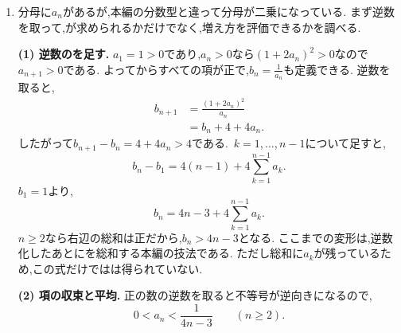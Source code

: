 \begin{enumerate}[label=\textbf{問\arabic*.},leftmargin=3.8em,format=\bookitemlink{practice-entrance}{solution}{problem}]
                第二項では$\sin^2\theta=1-\cos^2\theta$を使うと,
                \[
                 \begin{aligned}
                 V&=\left[\frac{\theta}{3\cos^3\theta}\right]_0^{\frac{\pi}{3}}
                      -\frac13I_3-(I_3-I_1)\\
                  &=\frac{8\pi}{9}-\frac43I_3+I_1\\
                  &=\frac{8\pi}{9}-\frac{4\sqrt3}{3}
                      +\frac13\log(2+\sqrt3).
                 \end{aligned}
                \]
                断面の半径と切断位置の関係を角度で表すと,最初に調べた$I_3$が自然に現れた.
                積分のはだけの技法ではなく,図形から生まれる積分を計算するためにも使える.
          \item 分母に$a_n$があるが,本編の分数型と違って分母が二乗になっている.
                まず逆数を取って,が求められるかだけでなく,増え方を評価できるかを調べる.
                \par\noindent
                \textbf{(1) 逆数のを足す.}
                $a_1=1>0$であり,$a_n>0$なら$(1+2a_n)^2>0$なので$a_{n+1}>0$である.
                よってからすべての項が正で,$\displaystyle b_n=\frac{1}{a_n}$も定義できる.
                逆数を取ると,
                \[
                 \begin{aligned}
                 b_{n+1}&=\frac{(1+2a_n)^2}{a_n}\\
                         &=b_n+4+4a_n.
                 \end{aligned}
                \]
                したがって$b_{n+1}-b_n=4+4a_n>4$である.
                \,$k=1,\ldots,n-1$について足すと,
                \[
                 b_n-b_1=4(n-1)+4\sum_{k=1}^{n-1}a_k.
                \]
                $b_1=1$より,
                \[
                 b_n=4n-3+4\sum_{k=1}^{n-1}a_k.
                \]
                $n\geq2$なら右辺の総和は正だから,$b_n>4n-3$となる.
                ここまでの変形は,逆数化したあとにを総和する本編の技法である.
                ただし総和に$a_k$が残っているため,この式だけではは得られていない.
                \par\noindent
                \textbf{(2) 項の収束と平均.}
                正の数の逆数を取ると不等号が逆向きになるので,
                \[
                 0<a_n<\frac1{4n-3}\qquad(n\geq2).
\]
\end{enumerate}

